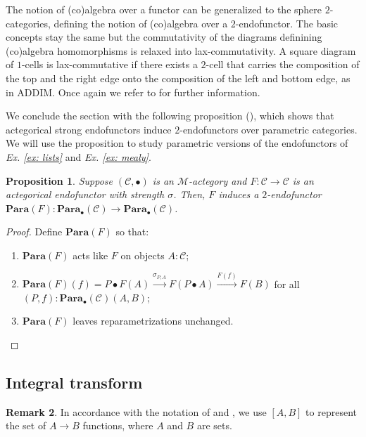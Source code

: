 \documentclass[11pt,a4paper,openright,twoside]{report}
\theoremstyle{plain}
\newtheorem{proposition}{Proposition}
\theoremstyle{definition}
\newtheorem{remark}[proposition]{Remark}
\begin{document}
The notion of (co)algebra over a functor can be generalized to the sphere $2$-categories, defining the notion of (co)algebra over a $2$-endofunctor. The basic concepts stay the same but the commutativity of the diagrams definining (co)algebra homomorphisms is relaxed into lax-commutativity. A square diagram of $1$-cells is lax-commutative if there exists a $2$-cell that carries the composition of the top and the right edge onto the composition of the left and bottom edge, as in ADDIM. Once again we refer to \cite{gavranovicposition} for further information.


We conclude the section with the following proposition (\cite{gavranovicposition}), which shows that actegorical strong endofunctors induce $2$-endofunctors over parametric categories. We will use the proposition to study parametric versions of the endofunctors of \textit{Ex. \ref{ex: lists}} and \textit{Ex. \ref{ex: mealy}}.

\begin{proposition}
  \label{prop: paraend}
  Suppose $(\mathcal{C}, \bullet)$ is an $\mathcal{M}$-actegory and $F: \mathcal{C} \to \mathcal{C}$ is an actegorical endofunctor with strength $\sigma$. Then, $F$ induces a  $2$-endofunctor $\mathbf{Para}(F): \mathbf{Para}_{\bullet}(\mathcal{C}) \to \mathbf{Para}_{\bullet}(\mathcal{C})$.
\end{proposition}
\begin{proof}
  Define $\mathbf{Para}(F)$ so that: 
  \begin{enumerate}
    \item $\mathbf{Para}(F)$ acts like $F$ on objects $A: \mathcal{C}$;
    \item $\mathbf{Para}(F)(f) = P \bullet F(A) \stackrel{\sigma_{P,A}}{\longrightarrow} F(P \bullet A) \stackrel{F(f)}{\longrightarrow} F(B)$ for all $(P,f):\mathbf{Para}_{\bullet}(\mathcal{C})(A,B)$;
    \item $\mathbf{Para}(F)$ leaves reparametrizations unchanged.
  \end{enumerate}
\end{proof}


\subsection{Integral transform}

\begin{remark}
  In accordance with the notation of \cite{dudzik2022graph} and \cite{dudzik2024asynchronous}, we use $[A,B]$ to represent the set of $A \to B$ functions, where $A$ and $B$ are sets.
\end{remark}
\end{document}
